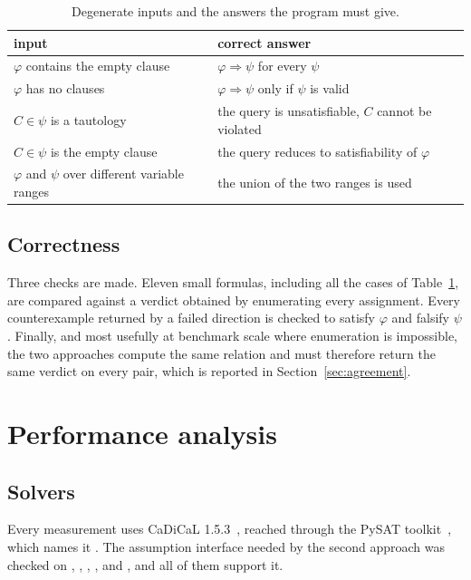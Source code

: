 \documentclass[11pt,a4paper]{article}
\begin{document}
\begin{table}[H]
\centering
\begin{tabular}{ll}
\toprule
input & correct answer \\
\midrule
$\varphi$ contains the empty clause & $\varphi \Rightarrow \psi$ for every $\psi$ \\
$\varphi$ has no clauses & $\varphi \Rightarrow \psi$ only if $\psi$ is valid \\
$C \in \psi$ is a tautology & the query is unsatisfiable, $C$ cannot be violated \\
$C \in \psi$ is the empty clause & the query reduces to satisfiability of $\varphi$ \\
$\varphi$ and $\psi$ over different variable ranges & the union of the two ranges is used \\
\bottomrule
\end{tabular}
\caption{Degenerate inputs and the answers the program must give.}
\label{tab:edge}
\end{table}

\subsection*{Correctness}

Three checks are made. Eleven small formulas, including all the cases of
Table~\ref{tab:edge}, are compared against a verdict obtained by enumerating
every assignment. Every counterexample returned by a failed direction is
checked to satisfy $\varphi$ and falsify $\psi$. Finally, and most usefully at
benchmark scale where enumeration is impossible, the two approaches compute
the same relation and must therefore return the same verdict on every pair,
which is reported in Section~\ref{sec:agreement}.

\section{Performance analysis}

\subsection*{Solvers}

Every measurement uses CaDiCaL 1.5.3~\cite{cadical}, reached through the PySAT
toolkit~\cite{pysat}, which names it . The assumption
interface needed by the second approach was checked on ,
, , ,
 and , and all of them support it.
\end{document}

